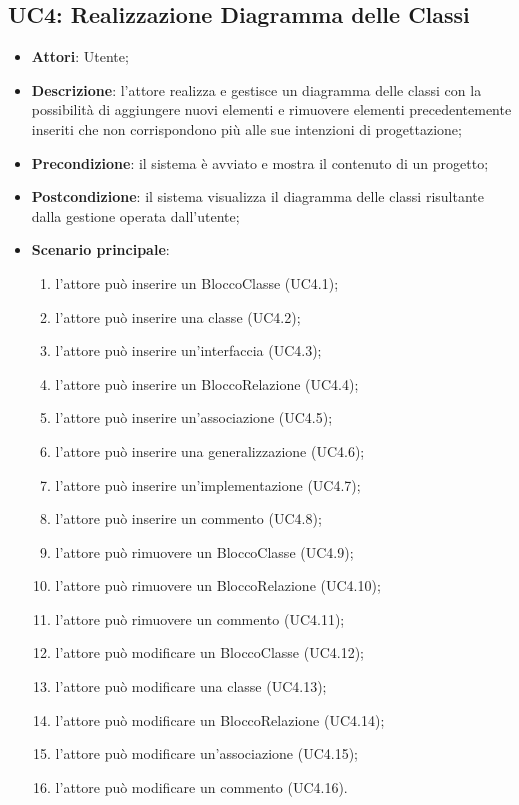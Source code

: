 \subsection{UC4: Realizzazione Diagramma delle Classi}
\label{UC4}
\begin{itemize}
	\item \textbf{Attori}: Utente;
	\item \textbf{Descrizione}: l'attore realizza e gestisce un diagramma delle classi con la possibilità di aggiungere nuovi elementi e rimuovere elementi precedentemente inseriti che non corrispondono più alle sue intenzioni di progettazione;
	\item \textbf{Precondizione}: il sistema è avviato e mostra il contenuto di un progetto;
	\item \textbf{Postcondizione}: il sistema visualizza il diagramma delle classi risultante dalla gestione operata dall'utente;
	\item \textbf{Scenario principale}:
	\begin{enumerate}
		\item l'attore può inserire un BloccoClasse (UC4.1);
		\item l'attore può inserire una classe (UC4.2);
		\item l'attore può inserire un'interfaccia (UC4.3);
		\item l'attore può inserire un BloccoRelazione (UC4.4);
		\item l'attore può inserire un'associazione (UC4.5);
		\item l'attore può inserire una generalizzazione (UC4.6);
		\item l'attore può inserire un'implementazione (UC4.7);
		\item l'attore può inserire un commento (UC4.8);
		\item l'attore può rimuovere un BloccoClasse (UC4.9);
		\item l'attore può rimuovere un BloccoRelazione (UC4.10);
		\item l'attore può rimuovere un commento (UC4.11);
		\item l'attore può modificare un BloccoClasse (UC4.12);
		\item l'attore può modificare una classe (UC4.13);
		\item l'attore può modificare un BloccoRelazione (UC4.14);
		\item l'attore può modificare un'associazione (UC4.15);
		\item l'attore può modificare un commento (UC4.16).

\end{enumerate}
\end{itemize}
